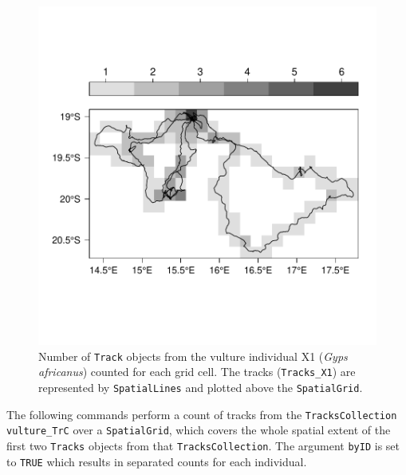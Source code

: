\documentclass[12pt, oneside, a4paper]{scrbook}
\let\code=\texttt
\begin{document}
\begin{figure}[!htb]
\centering
\includegraphics{trajagg-count_sp_vulture_TracksX1_fig_1}
\caption[Number of \code{Track} objects of a vulture counted over spatial geometries.]{Number of \code{Track} objects from the vulture individual X1 (\textit{Gyps africanus}) counted for each grid cell. The tracks (\code{Tracks\_X1}) are represented by \code{SpatialLines} and plotted above the \code{SpatialGrid}.}
\label{fig:counttracksx1oversp}
\end{figure}

\par\medskip

The following commands perform a count of tracks from the \code{TracksCollection} \code{vulture\_TrC} over a \code{SpatialGrid}, which covers the whole spatial extent of the first two \code{Tracks} objects from that \code{TracksCollection}. The argument \code{byID} is set to \code{TRUE} which results in separated counts for each individual.

\par\medskip
\end{document}
